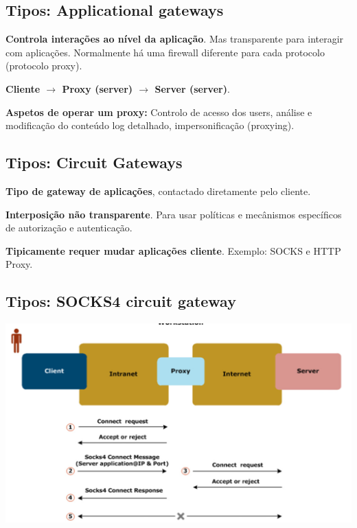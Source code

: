 \documentclass{article}
\begin{document}
\subsection{Tipos: Applicational gateways}

\begin{flushleft}
  \textbf{Controla interações ao nível da aplicação}. Mas transparente
  para interagir com aplicações. Normalmente há uma firewall diferente para
  cada protocolo (protocolo proxy).

  \vspace{2mm}

  \textbf{Cliente $\rightarrow$ Proxy (server) $\rightarrow$ Server (server)}.

  \vspace{2mm}

  \textbf{Aspetos de operar um proxy:} Controlo de acesso dos users, análise e modificação do conteúdo log detalhado,
  impersonificação (proxying).
\end{flushleft}

\subsection{Tipos: Circuit Gateways}

\begin{flushleft}
  \textbf{Tipo de gateway de aplicações}, contactado diretamente pelo cliente.

  \vspace{2mm}

  \textbf{Interposição não transparente}. Para usar políticas e mecânismos específicos de
  autorização e autenticação.
  
  \vspace{2mm}

  \textbf{Tipicamente requer mudar aplicações cliente}. Exemplo: SOCKS e HTTP Proxy.
\end{flushleft}


\subsection{Tipos: SOCKS4 circuit gateway}

\begin{center}
  \includegraphics[scale=0.4]{55}
\end{center}
\end{document}
